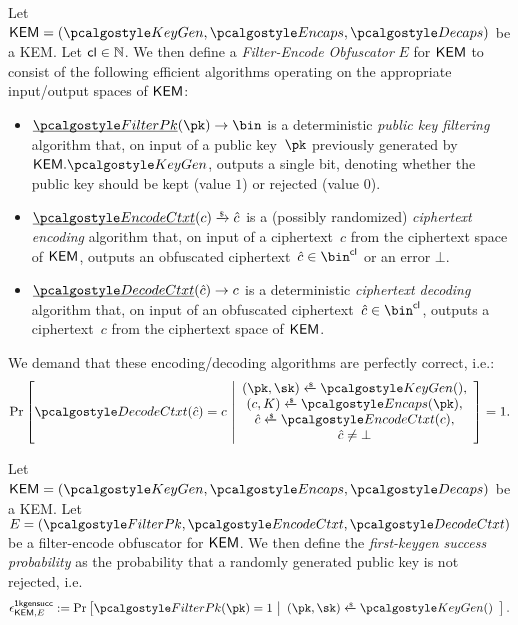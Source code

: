 \begin{definition}
\label{def:filter-encode-obfs}
    Let $\KEM = (\kgen, \encaps, \decaps)$ be a KEM.
    Let $\mathsf{cl} \in \mathbb N$.
    We then define a \emph{Filter-Encode Obfuscator} $E$ for $\mathsf{KEM}$ to consist of the following efficient algorithms operating on the appropriate input/output spaces of $\mathsf{KEM}$:
    \begin{itemize}
        \item $\ul{\filterpk}(\pk) \to \bin$
        is a deterministic \emph{public key filtering} algorithm that, on input of a public key~$\pk$ previously generated by $\KEM.\kgen$, outputs a single bit, denoting whether the public key should be kept (value $1$) or rejected (value $0$).
        \item $\ul{\encodectxt}(c) \tor \hat c$
        is a (possibly randomized) \emph{ciphertext encoding} algorithm that, on input of a ciphertext~$c$ from the ciphertext space of $\mathsf{KEM}$, outputs an obfuscated ciphertext~$\hat c \in \bin^{\obfctxtlen}$ or an error $\bot$.
        \item $\ul{\decodectxt}(\hat c) \to c$
        is a deterministic \emph{ciphertext decoding} algorithm that, on input of an obfuscated ciphertext~$\hat c \in \bin^{\obfctxtlen}$, outputs a ciphertext~$c$ from the ciphertext space of $\mathsf{KEM}$.
    \end{itemize}

    We demand that these encoding/decoding algorithms are perfectly correct, i.e.:
    \[
        \Pr\left[
            \decodectxt(\hat c) = c
        ~\middle|
            \begin{array}{c}
                (\pk, \sk) \getsr \kgen(),\\
                (c, K) \getsr \encaps(\pk),\\
                \hat c \getsr \encodectxt(c),\\
                \hat c \neq \bot
            \end{array}
        \right] = 1.
    \]
\end{definition}

\begin{definition}
\label{def:first-keygen-success}
    Let $\KEM = (\kgen, \encaps, \decaps)$ be a KEM.
    Let $E = (\filterpk, \encodectxt, \decodectxt)$ be a filter-encode obfuscator for $\mathsf{KEM}$.
    We then define the \emph{first-keygen success probability} as the probability that a randomly generated public key is not rejected, i.e.
    \[
        \epsilon^\firstkeygensuccess_{\KEM,E} :=
        \Pr\left[
            \filterpk(\pk) = 1
        ~\middle|
            \begin{array}{c}
                (\pk, \sk) \getsr \kgen()
            \end{array}
        \right].
    \]
\end{definition}

